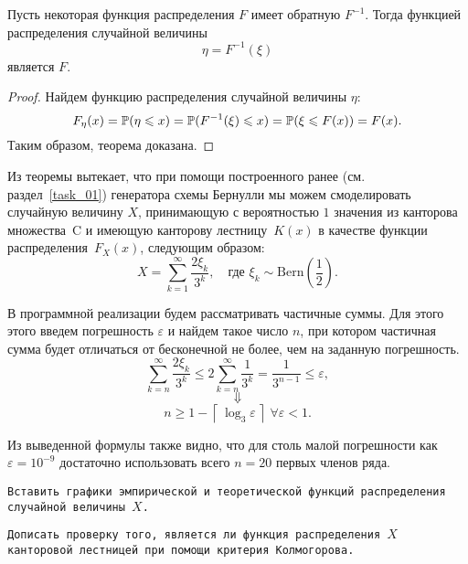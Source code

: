 \begin{theorem}
        Пусть некоторая функция распределения $F$ имеет обратную $F^{-1}$. Тогда функцией распределения случайной величины
        $$
                \eta = F^{-1}(\xi)
        $$
        является $F$.
\end{theorem}
\begin{proof}
        Найдем функцию распределения случайной величины $\eta$:
        $$
                F_\eta(x) =
                \mathbb{P}(\eta \leqslant x) =
                \mathbb{P}(F^{-1}(\xi) \leqslant x) =
                \mathbb{P}(\xi \leqslant F(x)) =
                F(x).
        $$
        Таким образом, теорема доказана.

\end{proof}

Из теоремы вытекает, что при помощи построенного ранее (см. раздел~\ref{task_01}) генератора схемы Бернулли мы можем смоделировать случайную величину $X$, принимающую с вероятностью $1$ значения из канторова множества~C и имеющую канторову лестницу~$K(x)$ в качестве функции распределения~$F_X(x)$, следующим образом:
$$
        X = \sum_{k = 1}^{\infty}\frac{2\xi_k}{3^k},
        \quad
        \mbox{где $\xi_k\sim\mbox{Bern}\left(\frac12\right)$.}
$$

В программной реализации будем рассматривать частичные суммы. Для этого этого введем погрешность $\varepsilon$ и найдем такое число $n$, при котором частичная сумма будет отличаться от бесконечной не более, чем на заданную погрешность.
$$
        \sum_{k=n}^{\infty} \frac{2\xi_k}{3^k} \leqslant 2\sum_{k=n}^{\infty}\frac{1}{3^k} = \frac{1}{3^{n-1}} \leqslant \varepsilon,
$$
$$
        \Downarrow
$$
$$
        n \geqslant 1 - \left\lceil\,\log_3 \varepsilon\,\right\rceil \; \forall \varepsilon < 1.
$$
\begin{remark}
        Из выведенной формулы также видно, что для столь малой погрешности как $\varepsilon = 10^{-9}$ достаточно использовать всего $n = 20$ первых членов ряда.
\end{remark}

\texttt{Вставить графики эмпирической и теоретической функций распределения случайной величины $X$.}

\texttt{Дописать проверку того, является ли функция распределения $X$ канторовой лестницей при помощи критерия Колмогорова.}